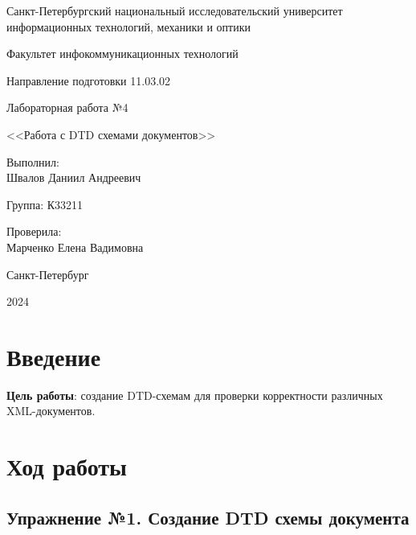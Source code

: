 \documentclass[a4paper, 14pt]{extarticle}
\begin{document}
\begin{titlepage}
  \vspace{0pt plus2fill}
  \noindent

  \vspace{0pt plus6fill}
  \begin{center}
    Санкт-Петербургский национальный исследовательский университет
    информационных технологий, механики и оптики

    \vspace{0pt plus3fill}

    Факультет инфокоммуникационных технологий

    Направление подготовки 11.03.02

    \vspace{0pt plus2fill}

    Лабораторная работа №4

    <<Работа с DTD схемами документов>>

  \end{center}

  \vspace{0pt plus6fill}
  \begin{flushright}
    Выполнил: \\
    Швалов Даниил Андреевич

    Группа: К33211

    Проверила: \\
    Марченко Елена Вадимовна
  \end{flushright}

  \vspace{0pt plus5fill}
  \begin{center}
    Санкт-Петербург

    2024
  \end{center}
\end{titlepage}

\section{Введение}

\textbf{Цель работы}: создание DTD-схемам для проверки корректности различных
XML-документов.

\section{Ход работы}

\subsection*{Упражнение №1. Создание DTD схемы документа}
\end{document}
